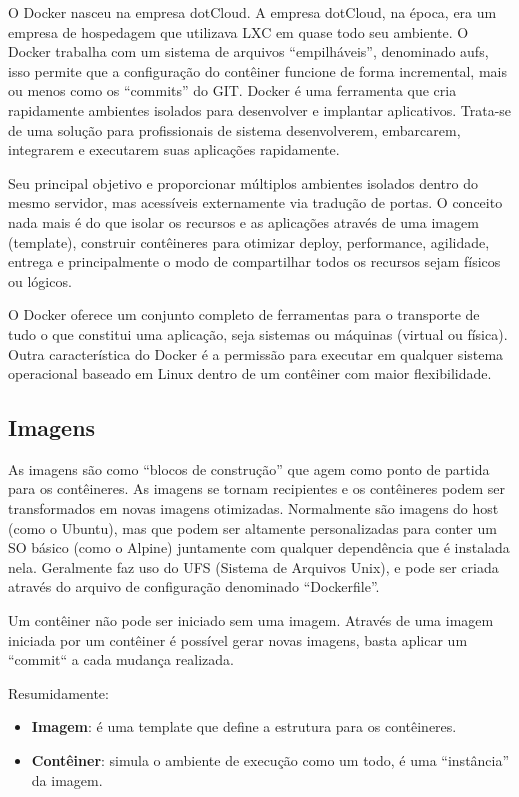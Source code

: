 \documentclass[a4paper,11pt]{article}
\begin{document}
O Docker nasceu na empresa dotCloud. A empresa dotCloud, na época, era um empresa de hospedagem que utilizava LXC em quase todo seu ambiente. O Docker trabalha com um sistema de arquivos ``empilháveis'', denominado aufs, isso permite que a configuração do contêiner funcione de forma incremental, mais ou menos como os ``commits'' do GIT. Docker é uma ferramenta que cria rapidamente ambientes isolados para desenvolver e implantar aplicativos. Trata-se de uma solução para profissionais de sistema desenvolverem, embarcarem, integrarem e executarem suas aplicações rapidamente.

Seu principal objetivo e proporcionar múltiplos ambientes isolados dentro do mesmo servidor, mas acessíveis externamente via tradução de portas. O conceito nada mais é do que isolar os recursos e as aplicações através de uma imagem (template), construir contêineres para otimizar deploy, performance, agilidade, entrega e principalmente o modo de compartilhar todos os recursos sejam físicos ou lógicos.

O Docker oferece um conjunto completo de ferramentas para o transporte de tudo o que constitui uma aplicação, seja sistemas ou máquinas (virtual ou física). Outra característica do Docker é a permissão para executar em qualquer sistema operacional baseado em Linux dentro de um contêiner com maior flexibilidade.

\subsection{Imagens}
As imagens são como ``blocos de construção'' que agem como ponto de partida para os contêineres. As imagens se tornam recipientes e os contêineres podem ser transformados em novas imagens otimizadas. Normalmente são imagens do host (como o Ubuntu), mas que podem ser altamente personalizadas para conter um SO básico (como o Alpine) juntamente com qualquer dependência que é instalada nela. Geralmente faz uso do UFS (Sistema de Arquivos Unix), e pode ser criada através do arquivo de configuração denominado ``Dockerfile''.

Um contêiner não pode ser iniciado sem uma imagem. Através de uma imagem 
iniciada por um contêiner é possível gerar novas imagens, basta aplicar um 
“commit“ a cada mudança realizada.

Resumidamente:
\begin{itemize}
	\item \textbf{Imagem}: é uma template que define a estrutura para os contêineres.
	\item \textbf{Contêiner}: simula o ambiente de execução como um todo, é uma ``instância'' da imagem.
\end{itemize}
\end{document}
